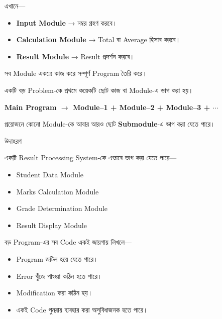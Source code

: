 এখানে—

\begin{itemize}

\item \textbf{Input Module} → নম্বর গ্রহণ করবে।

\item \textbf{Calculation Module} → Total বা Average হিসাব করবে।

\item \textbf{Result Module} → Result প্রদর্শন করবে।

\end{itemize}

সব Module একত্রে কাজ করে সম্পূর্ণ Program তৈরি করে।


একটি বড় Problem-কে প্রথমে কয়েকটি ছোট কাজ বা Module-এ ভাগ করা হয়।

\begin{center}

\textbf{
Main Program
\(\longrightarrow\)
Module--1 + Module--2 + Module--3 + \(\cdots\)
}

\end{center}

প্রয়োজনে কোনো Module-কে আবার আরও ছোট
\textbf{Submodule}-এ ভাগ করা যেতে পারে।

\begin{examplebox}{উদাহরণ}

একটি Result Processing System-কে এভাবে ভাগ করা যেতে পারে—

\begin{itemize}

\item Student Data Module
\item Marks Calculation Module
\item Grade Determination Module
\item Result Display Module

\end{itemize}

\end{examplebox}


বড় Program-এর সব Code একই জায়গায় লিখলে—

\begin{itemize}

\item Program জটিল হয়ে যেতে পারে।
\item Error খুঁজে পাওয়া কঠিন হতে পারে।
\item Modification করা কঠিন হয়।
\item একই Code পুনরায় ব্যবহার করা অসুবিধাজনক হতে পারে।

\end{itemize}

